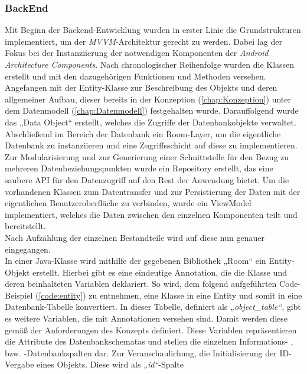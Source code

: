 \subsubsection{BackEnd}
Mit Beginn der Backend-Entwicklung wurden in erster Linie die Grundstrukturen implementiert, um der \textit{MVVM}-Architektur gerecht zu werden. Dabei lag 
der Fokus bei der Instanziierung der notwendigen Komponenten der \textit{Android Architecture Components}. Nach chronologischer Reihenfolge wurden die Klassen 
erstellt und mit den dazugehörigen Funktionen und Methoden versehen. Angefangen mit der Entity-Klasse zur Beschreibung des Objekts und deren allgemeiner Aufbau, 
dieser bereits in der Konzeption (\ref{chap:Konzeption}) unter dem Datenmodell (\ref{chap:Datenmodell}) festgehalten wurde. Darauffolgend wurde das „Data Object“ 
erstellt, welches die Zugriffe der Datenbankobjekte verwaltet. Abschließend im Bereich der Datenbank ein Room-Layer, um die eigentliche Datenbank zu 
instanziieren und eine Zugriffsschicht auf diese zu implementieren. 
\\ 
Zur Modularisierung und zur Generierung einer Schnittstelle für den Bezug zu mehreren Datenbeziehungspunkten wurde ein Repository erstellt, das eine saubere 
\acs{API} für den Datenzugriff auf den Rest der Anwendung bietet. Um die vorhandenen Klassen zum Datentransfer und zur Persistierung der Daten mit der 
eigentlichen Benutzeroberfläche zu verbinden, wurde ein ViewModel implementiert, welches die Daten zwischen den einzelnen Komponenten teilt und bereitstellt. 
\\ 
\linebreak 
Nach Aufzählung der einzelnen Bestandteile wird auf diese nun genauer eingegangen. 
\\ 
\linebreak
In einer Java-Klasse wird mithilfe der gegebenen Bibliothek „Room“ ein Entity-Objekt erstellt. Hierbei gibt es eine eindeutige Annotation, die die Klasse und 
deren beinhalteten Variablen deklariert. So wird, dem folgend aufgeführten Code-Beispiel (\ref{code:entity}) zu entnehmen, eine Klasse in eine Entity und somit 
in eine Datenbank-Tabelle konvertiert. In dieser Tabelle, definiert als \textit{„object\_table“}, gibt es weitere Variablen, die mit Annotationen versehen sind. 
Damit werden diese gemäß der Anforderungen des Konzepts definiert. Diese Variablen repräsentieren die Attribute des Datenbankschematas und stellen die einzelnen 
Informations- , bzw. -Datenbankspalten dar. Zur Veranschaulichung, die Initialisierung der \acs{ID}-Vergabe eines Objekts. Diese wird als \textit{„id“}-Spalte 
